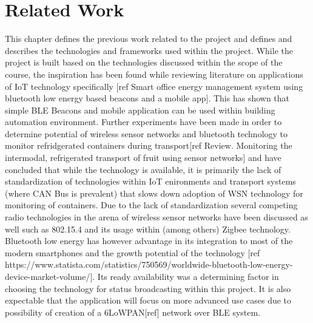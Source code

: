 \chapter{Related Work}
\label{cha:related-work}


This chapter defines the previous work related to the project and defines and describes the technologies and frameworks used within the project. While the project is built based on the technologies discussed within the scope of the course, the inspiration has been found while reviewing literature on applications of IoT technology specifically [ref Smart office energy management system using bluetooth low energy based beacons and a mobile app]. This has shown that simple BLE Beacons and mobile application can be used within building automation environment. Further experiments have been made in order to determine potential of wireless sensor networks and bluetooth technology to monitor refridgerated containers during transport[ref Review. Monitoring the intermodal, refrigerated transport of fruit using sensor networks] and have concluded that while the technology is available, it is primarily the lack of standardization of technologies within IoT enironments and transport systems (where CAN Bus is prevalent) that slows down adoption of WSN technology for monitoring of containers. Due to the lack of standardization several competing radio technologies in the arena of wireless sensor networks have been discussed as well such as 802.15.4 and its usage within (among others) Zigbee technology. Bluetooth low energy has however advantage in its integration to most of the modern smartphones and the growth potential of the technology [ref https://www.statista.com/statistics/750569/worldwide-bluetooth-low-energy-device-market-volume/]. Its ready availability was a determining factor in choosing the technology for status broadcasting within this project. It is also expectable that the application will focus on more advanced use cases due to possibility of creation of a 6LoWPAN[ref] network over BLE system. 

\bigskip

